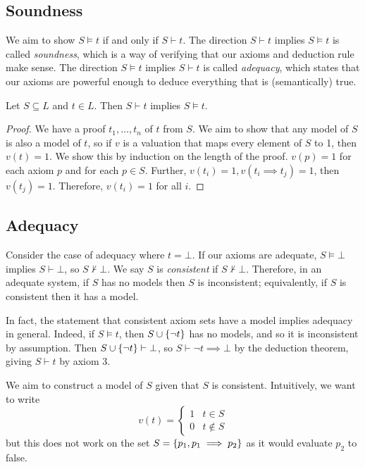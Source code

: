 \subsection{Soundness}
We aim to show \( S \models t \) if and only if \( S \vdash t \).
The direction \( S \vdash t \) implies \( S \models t \) is called \emph{soundness}, which is a way of verifying that our axioms and deduction rule make sense.
The direction \( S \models t \) implies \( S \vdash t \) is called \emph{adequacy}, which states that our axioms are powerful enough to deduce everything that is (semantically) true.
\begin{proposition}
    Let \( S \subseteq L \) and \( t \in L \).
    Then \( S \vdash t \) implies \( S \models t \).
\end{proposition}
\begin{proof}
    We have a proof \( t_1, \dots, t_n \) of \( t \) from \( S \).
    We aim to show that any model of \( S \) is also a model of \( t \), so if \( v \) is a valuation that maps every element of \( S \) to 1, then \( v(t) = 1 \).
    We show this by induction on the length of the proof.
    \( v(p) = 1 \) for each axiom \( p \) and for each \( p \in S \).
    Further, \( v(t_i) = 1, v(t_i \implies t_j) = 1 \), then \( v(t_j) = 1 \).
    Therefore, \( v(t_i) = 1 \) for all \( i \).
\end{proof}

\subsection{Adequacy}
Consider the case of adequacy where \( t = \bot \).
If our axioms are adequate, \( S \models \bot \) implies \( S \vdash \bot \), so \( S \not\vdash \bot \).
We say \( S \) is \emph{consistent} if \( S \not\vdash \bot \).
Therefore, in an adequate system, if \( S \) has no models then \( S \) is inconsistent; equivalently, if \( S \) is consistent then it has a model.

In fact, the statement that consistent axiom sets have a model implies adequacy in general.
Indeed, if \( S \models t \), then \( S \cup \qty{\neg t} \) has no models, and so it is inconsistent by assumption.
Then \( S \cup \qty{\neg t} \vdash \bot \), so \( S \vdash \neg t \implies \bot \) by the deduction theorem, giving \( S \vdash t \) by axiom 3.

We aim to construct a model of \( S \) given that \( S \) is consistent.
Intuitively, we want to write
\[ v(t) = \begin{cases}
    1 & t \in S \\
    0 & t \not\in S
\end{cases} \]
but this does not work on the set \( S = \qty{p_1, p_1 \implies p_2} \) as it would evaluate \( p_2 \) to false.

